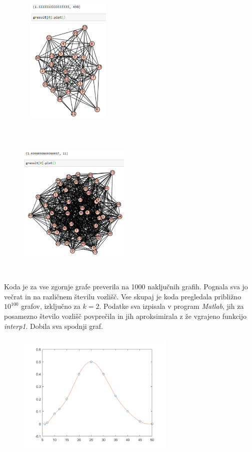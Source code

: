 \documentclass[a4paper]{article}
\begin{document}
\begin{figure}[h!]
    \centering
    \includegraphics[width=4.7cm, height=6cm]{Slika8}
    \label{fig:mesh1}
\end{figure}\\
\begin{figure}[h!]
    \centering
    \includegraphics[width=5.3cm, height=6.3cm]{Slika11}
    \label{fig:mesh1}
\end{figure}\\
Koda je za vse zgornje grafe preverila na 1000 naključnih grafih. Pognala sva jo večrat in na različnem številu vozlišč. Vse skupaj je koda pregledala približno $10^{100}$ grafov, izključno za $k = 2$. Podatke sva izpisala v program \textit{Matlab}, jih za posamezno število vozlišč povprečila in jih aproksimirala z že vgrajeno funkcijo \textit{interp1}. Dobila sva spodnji graf.
\begin{figure}[h!]
    \centering
    \includegraphics[width=7.5cm, height=6cm]{Slika3}
    \label{fig:mesh1}
\end{figure}\\
\end{document}
